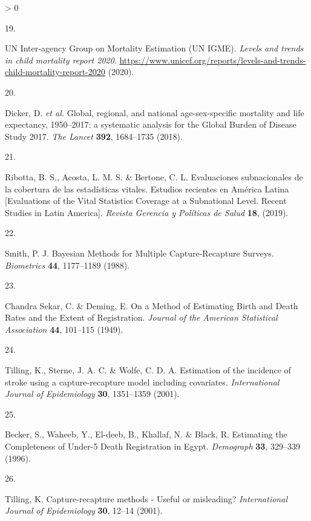 \documentclass[
]{article}
\newlength{\cslhangindent}
\newlength{\csllabelwidth}
\newenvironment{CSLReferences}[2] %
 {%
  \setlength{\parindent}{0pt}
  \ifodd #1 \everypar{\setlength{\hangindent}{\cslhangindent}}\ignorespaces\fi
  \ifnum #2 > 0
  \setlength{\parskip}{#2\baselineskip}
  \fi
 }%
 {}
\newcommand{\CSLLeftMargin}[1]{\parbox[t]{\csllabelwidth}{#1}}
\newcommand{\CSLRightInline}[1]{\parbox[t]{\linewidth - \csllabelwidth}{#1}\break}
\begin{document}
\begin{CSLReferences}{0}{0}
\leavevmode\hypertarget{ref-UNInter-agencyGrouponMortalityEstimationUNIGME2020}{}%
\CSLLeftMargin{19. }
\CSLRightInline{UN Inter-agency Group on Mortality Estimation (UN IGME). \emph{{Levels and trends in child mortality report 2020}}. \url{https://www.unicef.org/reports/levels-and-trends-child-mortality-report-2020} (2020).}

\leavevmode\hypertarget{ref-Dicker2018}{}%
\CSLLeftMargin{20. }
\CSLRightInline{Dicker, D. \emph{et al.} {Global, regional, and national age-sex-specific mortality and life expectancy, 1950--2017: a systematic analysis for the Global Burden of Disease Study 2017}. \emph{The Lancet} \textbf{392}, 1684--1735 (2018).}

\leavevmode\hypertarget{ref-Ribotta2019}{}%
\CSLLeftMargin{21. }
\CSLRightInline{Ribotta, B. S., Acosta, L. M. S. \& Bertone, C. L. {Evaluaciones subnacionales de la cobertura de las estad{í}sticas vitales. Estudios recientes en Am{é}rica Latina {[}Evaluations of the Vital Statistics Coverage at a Subnational Level. Recent Studies in Latin America{]}}. \emph{Revista Gerencia y Pol{í}ticas de Salud} \textbf{18}, (2019).}

\leavevmode\hypertarget{ref-Smith1988}{}%
\CSLLeftMargin{22. }
\CSLRightInline{Smith, P. J. {Bayesian Methods for Multiple Capture-Recapture Surveys}. \emph{Biometrics} \textbf{44}, 1177--1189 (1988).}

\leavevmode\hypertarget{ref-ChandraSekar1949}{}%
\CSLLeftMargin{23. }
\CSLRightInline{Chandra Sekar, C. \& Deming, E. {On a Method of Estimating Birth and Death Rates and the Extent of Registration}. \emph{Journal of the American Statistical Association} \textbf{44}, 101--115 (1949).}

\leavevmode\hypertarget{ref-Tilling2001a}{}%
\CSLLeftMargin{24. }
\CSLRightInline{Tilling, K., Sterne, J. A. C. \& Wolfe, C. D. A. {Estimation of the incidence of stroke using a capture-recapture model including covariates}. \emph{International Journal of Epidemiology} \textbf{30}, 1351--1359 (2001).}

\leavevmode\hypertarget{ref-Becker1996}{}%
\CSLLeftMargin{25. }
\CSLRightInline{Becker, S., Waheeb, Y., El-deeb, B., Khallaf, N. \& Black, R. {Estimating the Completeness of Under-5 Death Registration in Egypt}. \emph{Demograph} \textbf{33}, 329--339 (1996).}

\leavevmode\hypertarget{ref-Tilling2001}{}%
\CSLLeftMargin{26. }
\CSLRightInline{Tilling, K. {Capture-recapture methods - Useful or misleading?} \emph{International Journal of Epidemiology} \textbf{30}, 12--14 (2001).}


\end{CSLReferences}
\end{document}
